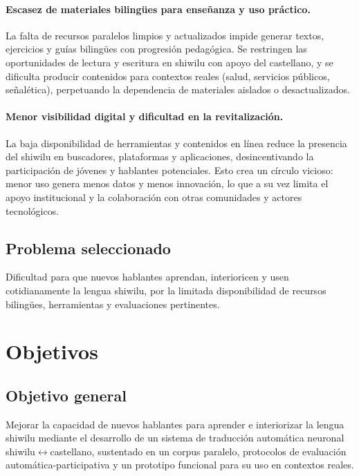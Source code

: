 \documentclass[12pt,a4paper,oneside]{book}
\begin{document}
\paragraph{Escasez de materiales bilingües para enseñanza y uso práctico.}
La falta de recursos paralelos limpios y actualizados impide generar textos, ejercicios y guías bilingües con progresión pedagógica. Se restringen las oportunidades de lectura y escritura en shiwilu con apoyo del castellano, y se dificulta producir contenidos para contextos reales (salud, servicios públicos, señalética), perpetuando la dependencia de materiales aislados o desactualizados.

\paragraph{Menor visibilidad digital y dificultad en la revitalización.}
La baja disponibilidad de herramientas y contenidos en línea reduce la presencia del shiwilu en buscadores, plataformas y aplicaciones, desincentivando la participación de jóvenes y hablantes potenciales. Esto crea un círculo vicioso: menor uso genera menos datos y menos innovación, lo que a su vez limita el apoyo institucional y la colaboración con otras comunidades y actores tecnológicos.

\subsection{Problema seleccionado}\label{problema-seleccionado}

Dificultad para que nuevos hablantes aprendan, interioricen y usen cotidianamente la lengua shiwilu, por la limitada disponibilidad de recursos bilingües, herramientas y evaluaciones pertinentes.

\section{Objetivos}\label{objetivos}

\subsection{Objetivo general}\label{objetivo-general}

Mejorar la capacidad de nuevos hablantes para aprender e interiorizar la lengua shiwilu mediante el desarrollo de un sistema de traducción automática neuronal shiwilu$\leftrightarrow$castellano, sustentado en un corpus paralelo, protocolos de evaluación automática-participativa y un prototipo funcional para su uso en contextos reales.
\end{document}
